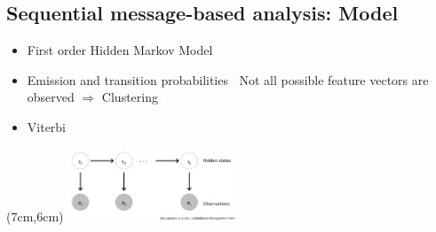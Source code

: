 \documentclass[
paper=128mm:96mm, %
fontsize=11pt, %
pagesize, %
parskip=half-, %
]{scrartcl} %
\newcommand*{\mygreen}[1]{\textcolor{mygreen}{#1}}
\theoremstyle{mythmstyle} %
\newtheorem{theorem}{Theorem}[section] %
\newtheorem{remark}[theorem]{Remark} %
\newtheorem{algorithm}[theorem]{Algorithm} %
\newcommand*{\mybox}[2]{ %
\par\noindent
\begin{tikzpicture}[mynodestyle/.style={rectangle,draw=mygreen,thick,inner sep=2mm,text justified,top color=white,bottom color=white,above}]\node[mynodestyle,at={(0.5*#1+2mm+0.4pt,0)}]{ %
\begin{minipage}[t]{#1}
#2
\end{minipage}
};
\end{tikzpicture}
\par\vspace{-1.3em}}
\begin{document}

\clearpage


\subsection*{Sequential message-based analysis: Model}

\begin{itemize}

\item First order Hidden Markov Model

\item Emission and transition probabilities
\subitem \textbullet $\:$ Not all possible feature vectors are observed $\Rightarrow$ Clustering

\item Viterbi

\end{itemize}

\begin{textblock*}{5cm}(7cm,6cm) %
\includegraphics[width=5cm]{HMM_observations}
\end{textblock*}
\end{document}
